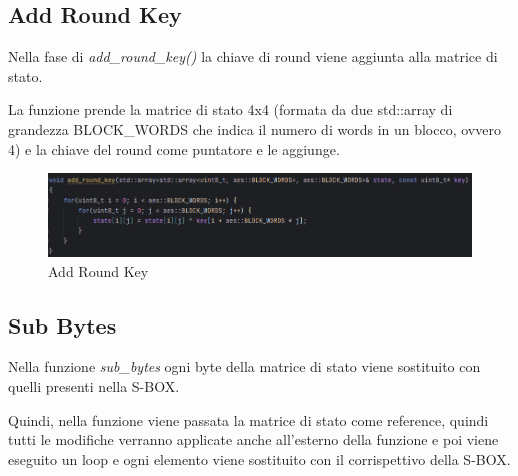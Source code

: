 

\subsection{Add Round Key}

\textsf{\small Nella fase di \emph{add\_round\_key()} la chiave di round viene aggiunta alla matrice di stato.}

\textsf{\small La funzione prende la matrice di stato 4x4 (formata da due std::array di grandezza BLOCK\_WORDS che indica il numero di words in un blocco, ovvero 4) e la chiave del round come puntatore e le aggiunge.}

\begin{figure}[H]
	\centering
	\includegraphics[width=1\textwidth, height=1\textheight, keepaspectratio]{./images/code/cpp/encryption/add_round_key.PNG}
	\caption{Add Round Key}
	\label{fig:add_round_key}
\end{figure}

\subsection{Sub Bytes}

\textsf{\small Nella funzione \emph{sub\_bytes} ogni byte della matrice di stato viene sostituito con quelli presenti nella S-BOX.}

\textsf{\small Quindi, nella funzione viene passata la matrice di stato come reference, quindi tutti le modifiche verranno applicate anche all'esterno della funzione e poi viene eseguito un loop e ogni elemento viene sostituito con il corrispettivo della S-BOX.}

